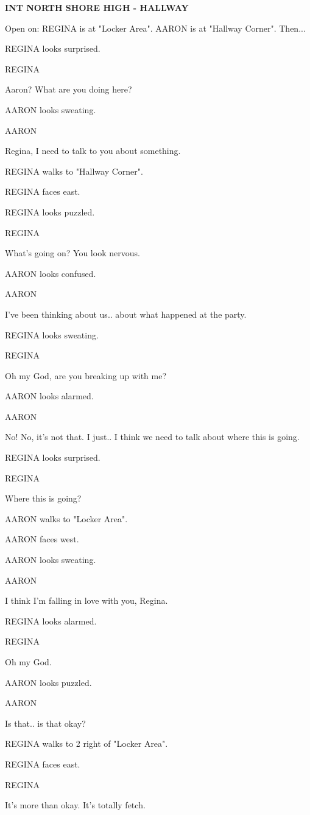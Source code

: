 \documentclass[11pt,letterpaper,oldstylefigures]{memoir}
\newcommand{\slugline}[1]{\nobreak\textbf{\MakeUppercase{#1}}\par\nobreak\vspace{1\baselineskip}}
\newcommand{\speaker}[1]{\nobreak\hspace*{0.333\textwidth}\MakeUppercase{#1}\par\nobreak\vspace{0.5\baselineskip}}
\newcommand{\dialogue}[1]{\nobreak\hspace*{0.25\textwidth}\begin{minipage}{0.5\textwidth}#1\end{minipage}\par\vspace{1\baselineskip}}
\newcommand{\stagedir}[1]{#1\par\vspace{1\baselineskip}}
\newenvironment{FountainExample}
  {\begingroup
  \ttfamily\small
   \setlength{\parindent}{0pt}
  \setlength{\parskip}{0.5em}
  \allowdisplaybreaks
  \setlength{\displaywidowpenalty}{0}
  \setlength{\widowpenalty}{0}
  \setlength{\clubpenalty}{0}
  \setlength{\interlinepenalty}{0}
}
  {\endgroup}
\begin{document}
\begin{FountainExample}
\slugline{INT NORTH SHORE HIGH - HALLWAY}

\stagedir{Open on: REGINA is at "Locker Area". AARON is at "Hallway Corner". Then...}

\stagedir{REGINA looks surprised.}

\speaker{REGINA}
\dialogue{Aaron? What are you doing here?}
\stagedir{AARON looks sweating.}

\speaker{AARON}
\dialogue{Regina, I need to talk to you about something.}

\stagedir{REGINA walks to "Hallway Corner".}

\stagedir{REGINA faces east.}

\stagedir{REGINA looks puzzled.}

\speaker{REGINA}
\dialogue{What's going on? You look nervous.}

\stagedir{AARON looks confused.}

\speaker{AARON}
\dialogue{I've been thinking about us.. about what happened at the party.}

\stagedir{REGINA looks sweating.}

\speaker{REGINA}
\dialogue{Oh my God, are you breaking up with me?}

\stagedir{AARON looks alarmed.}

\speaker{AARON}
\dialogue{No! No, it's not that. I just.. I think we need to talk about where this is going.}

\stagedir{REGINA looks surprised.}

\speaker{REGINA}
\dialogue{Where this is going?}

\stagedir{AARON walks to "Locker Area".}

\stagedir{AARON faces west.}

\stagedir{AARON looks sweating.}

\speaker{AARON}
\dialogue{I think I'm falling in love with you, Regina.}

\stagedir{REGINA looks alarmed.}

\speaker{REGINA}
\dialogue{Oh my God.}

\stagedir{AARON looks puzzled.}

\speaker{AARON}
\dialogue{Is that.. is that okay?}

\stagedir{REGINA walks to 2 right of "Locker Area".}

\stagedir{REGINA faces east.}

\speaker{REGINA}
\dialogue{It's more than okay. It's totally fetch.}
\end{FountainExample}
\end{document}
